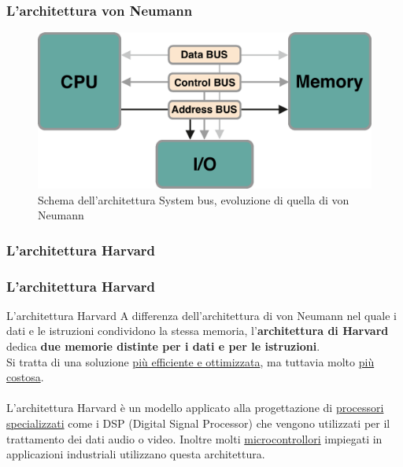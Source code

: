 \begin{frame}
	\frametitle{L'architettura von Neumann}
	
	\begin{figure}[!htbp]
		\centering 
		\includegraphics[width=0.9\linewidth]{images/3_architetture/architecture_von_neumann_system_bus.pdf}
			\caption{Schema dell'architettura System bus, evoluzione di quella di von Neumann} 
	\end{figure}
	
\end{frame}





\subsubsection[L'architettura Harvard]{L'architettura Harvard}

\begin{frame}
	\frametitle{L'architettura Harvard}
	
	\begin{block}{L'architettura Harvard}
		A differenza dell'architettura di von Neumann nel quale i dati e le istruzioni condividono la stessa memoria, l'\textbf{architettura di Harvard} dedica \textbf{due memorie distinte per i dati e per le istruzioni}.\\
		Si tratta di una soluzione \underline{più efficiente e ottimizzata}, ma tuttavia molto \underline{più costosa}.\\~\\
		L'architettura Harvard è un modello applicato alla progettazione di 	\underline{processori specializzati} come i DSP (Digital Signal Processor) che vengono utilizzati per il trattamento dei dati audio o video. Inoltre molti \underline{microcontrollori} impiegati in applicazioni industriali utilizzano questa architettura.
	\end{block}
	
	
\end{frame}


